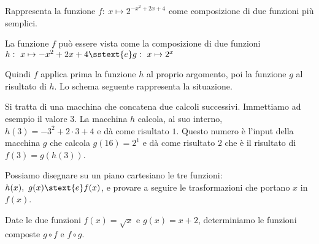 \begin{esempio}
Rappresenta la funzione  \(f:~x \mapsto 2^{-x^2+2x+4}\)
come composizione di due funzioni più semplici. 

La funzione \(f\) può essere vista come la composizione di due funzioni 
\(h:~x \mapsto -x^2+2x+4 \sstext{e} g:~x \mapsto 2^x\) 

Quindi \(f\) applica prima la funzione \(h\) al proprio argomento, poi la 
funzione \(g\) al risultato di \(h\).
Lo schema seguente rappresenta la situazione.

\hspace{-7mm}\scalebox{.8}{\boxfunzionecompostab}
\label{gra:differenziazione_boxcompostaa}

Si tratta di una macchina che concatena due calcoli successivi. 
Immettiamo ad esempio il valore \(3\). 
La macchina \(h\) calcola, al suo interno, \(h(3)=-3^2+2\cdot 3+4\) e dà 
come risultato \(1\).
Questo numero è l'input della macchina \(g\) che calcola 
\(g(16)=2^1\) e dà come risultato \(2\)
che è il risultato di \(f(3) = g(h(3))\).

Possiamo disegnare su un piano cartesiano le tre funzioni: 
\(h(x),~g(x) \stext{e} f(x)\), e provare a seguire le trasformazioni che 
portano \(x\) in \(f(x)\).

\end{esempio}

\begin{esempio} 
Date le due funzioni \(f(x)=\sqrt{x}\) e \(g(x)= x+2\), determiniamo le 
funzioni composte \(g \circ f\) e \(f\circ g\).

\end{esempio}

